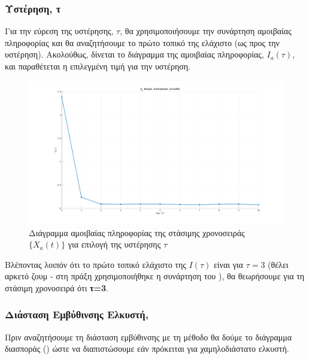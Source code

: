 \subsubsection{Υστέρηση, τ}

Για την εύρεση της υστέρησης, $\tau$, θα χρησιμοποιήσουμε την συνάρτηση αμοιβαίας πληροφορίας και θα αναζητήσουμε το πρώτο τοπικό της ελάχιστο (ως προς την υστέρηση). Ακολούθως, δίνεται το διάγραμμα της αμοιβαίας πληροφορίας, $I_a(\tau)$, και παραθέτεται η επιλεγμένη τιμή για την υστέρηση.

\begin{figure}[H]
    \begin{center}
        \includegraphics[width=\textwidth]{assets/images/plots/mutual_information_a.svg.pdf}
        \caption{Διάγραμμα αμοιβαίας πληροφορίας της στάσιμης χρονοσειράς $\{X_a(t)\}$ για επιλογή της υστέρησης $\tau$}
        \label{fig:mutual_information_a}
    \end{center}
\end{figure}

Βλέποντας λοιπόν ότι το πρώτο τοπικό ελάχιστο της $I(\tau)$ είναι για $\tau=3$ (θέλει αρκετό ζουμ - στη πράξη χρησιμοποιήθηκε η συνάρτηση \texttt{} του ), θα θεωρήσουμε για τη στάσιμη χρονοσειρά  ότι \textbf{τ=3}.

\subsubsection{Διάσταση Εμβύθινσης Ελκυστή, }

Πριν αναζητήσουμε τη διάσταση εμβύθινσης με τη μέθοδο  θα δούμε το διάγραμμα διασποράς () ώστε να διαπιστώσουμε εάν πρόκειται για χαμηλοδιάστατο ελκυστή. 

